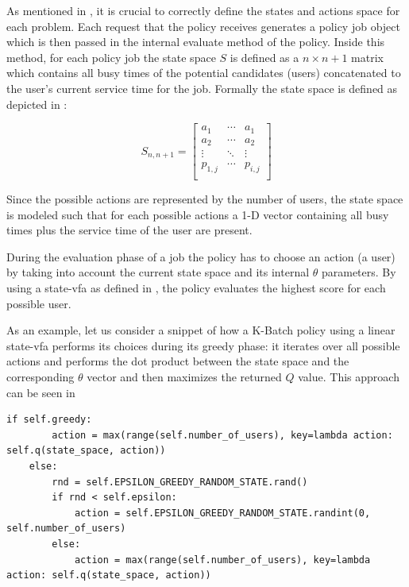 \documentclass{seal_thesis}
\begin{document}
As mentioned in , it is crucial to correctly define the states and actions space for each problem. Each request that the policy receives generates a policy job object which is then passed in the internal evaluate method of the policy. Inside this method, for each policy job the state space $S$ is defined as a $n \times n+1$ matrix which contains all busy times of the potential candidates (\ie users) concatenated to the user's current service time for the job. Formally the state space is defined as depicted in :

\begin{equation}
\label{eq:kbatch_sp}
	S_{n,n+1} = 
	\begin{bmatrix}
	a_1 & \cdots & a_1 \\
	a_2 & \cdots & a_2 \\
	\vdots & \ddots & \vdots \\
	p_{1,j} & \cdots & p_{i,j} \\
	\end{bmatrix}
\end{equation}

Since the possible actions are represented by the number of users, the state space is modeled such that for each possible actions a 1-D vector containing all busy times plus the service time of the user are present.

During the evaluation phase of a job the policy has to choose an action (\ie a user) by taking into account the current state space and its internal $\theta$ parameters. By using a state-\gls{vfa} as defined in , the policy evaluates the highest score for each possible user.

As an example, let us consider a snippet of how a K-Batch policy using a linear state-\gls{vfa} performs its choices during its greedy phase: it iterates over all possible actions and performs the dot product between the state space and the corresponding $\theta$ vector and then maximizes the returned $Q$ value. This approach can be seen in  

\begin{lstlisting}[caption=$\epsilon$-Greedy approach,label=lst:e_greedy,style=CustomPython]
    if self.greedy:
        action = max(range(self.number_of_users), key=lambda action: self.q(state_space, action))
    else:
        rnd = self.EPSILON_GREEDY_RANDOM_STATE.rand()
        if rnd < self.epsilon:
            action = self.EPSILON_GREEDY_RANDOM_STATE.randint(0, self.number_of_users)
        else:
            action = max(range(self.number_of_users), key=lambda action: self.q(state_space, action))
\end{lstlisting}
\end{document}
